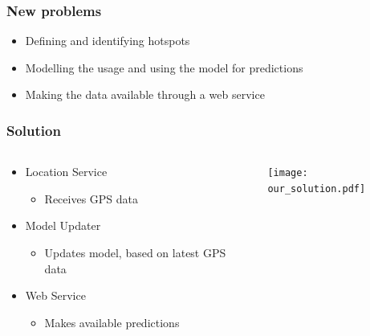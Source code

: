 \begin{frame}
\frametitle{New problems}
\begin{itemize}
\item Defining and identifying hotspots
\item Modelling the usage and using the model for predictions
\item Making the data available through a web service
\end{itemize}
\end{frame}

\begin{frame}
\frametitle{Solution}
\begin{columns}
\begin{column}{.35\textwidth}
\begin{itemize}
\item Location Service
\begin{itemize}
\item Receives GPS data
\end{itemize}
\item Model Updater
\begin{itemize}
\item Updates model, based on latest GPS data
\end{itemize}
\item Web Service
\begin{itemize}
\item Makes available predictions
\end{itemize}
\end{itemize}
\end{column}
\begin{column}{.65\textwidth}
\centering
\texttt{[image: our\_solution.pdf]}
\end{column}
\end{columns}
\end{frame}
